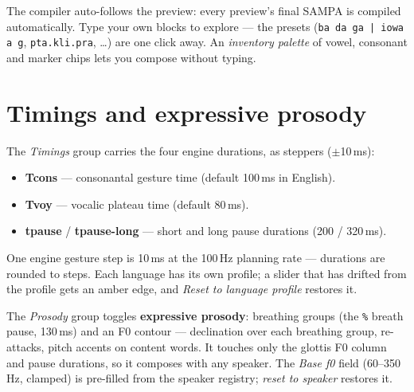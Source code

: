 \documentclass[11pt,a4paper]{article}
\begin{document}
The compiler auto-follows the preview: every preview's final SAMPA is
compiled automatically. Type your own blocks to explore --- the presets
(\texttt{ba da ga | iowa a g}, \texttt{pta.kli.pra}, \ldots) are one
click away. An \emph{inventory palette} of vowel, consonant and marker
chips lets you compose without typing.

\section{Timings and expressive prosody}

The \emph{Timings} group carries the four engine durations, as steppers
($\pm$10\,ms):

\begin{itemize}
\item \textbf{Tcons} --- consonantal gesture time (default 100\,ms in
  English).
\item \textbf{Tvoy} --- vocalic plateau time (default 80\,ms).
\item \textbf{tpause} / \textbf{tpause-long} --- short and long pause
  durations (200 / 320\,ms).
\end{itemize}

One engine gesture step is 10\,ms at the 100\,Hz planning rate ---
durations are rounded to steps. Each language has its own profile; a
slider that has drifted from the profile gets an amber edge, and
\emph{Reset to language profile} restores it.

The \emph{Prosody} group toggles \textbf{expressive prosody}: breathing
groups (the \texttt{\%} breath pause, 130\,ms) and an F0 contour ---
declination over each breathing group, re-attacks, pitch accents on
content words. It touches only the glottis F0 column and pause durations,
so it composes with any speaker. The \emph{Base f0} field (60--350\,Hz,
clamped) is pre-filled from the speaker registry; \emph{reset to speaker}
restores it.
\end{document}

